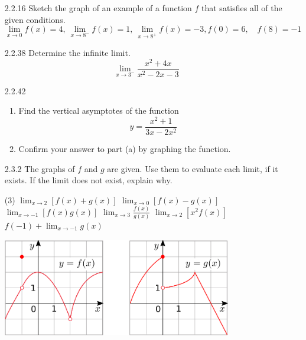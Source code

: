 \documentclass{article}
\begin{document}
\begin{enumerate}
    \newpage

    \item[2.2.16]
        Sketch the graph of an example of a function $f$ that satisfies all of the given conditions.
        \[
            \lim_{x \to 0} f(x) = 4,\
            \lim_{x \to 8^{-}} f(x) = 1,\
            \lim_{x \to 8^{+}} f(x) = -3,
            f(0)=6,\quad f(8)=-1
        \]

    \vspace{5.5cm}

    \item[2.2.38]
        Determine the infinite limit.
        \[
            \lim_{x \to 3^{-}} \frac{x^2 + 4x}{x^2 - 2x - 3}
        \]

    \vspace{4cm}

    \item[2.2.42]
        \begin{enumerate}
            \item Find the vertical asymptotes of the function
            \[
                y = \frac{x^2 + 1}{3x - 2x^2}
            \]
            \item Confirm your answer to part (a) by graphing the function.
        \end{enumerate}

    \newpage

    \item[2.3.2]
        The graphs of $f$ and $g$ are given. Use them to evaluate each limit, if it exists. If the limit does not exist, explain why.
        \begin{tasks}(3)
            \task
                $\displaystyle \lim_{x \to 2} \left[f(x) + g(x) \right]$
            \task
                $\displaystyle \lim_{x \to 0} \left[f(x) - g(x) \right]$
            \task
                $\displaystyle \lim_{x \to -1} \left[f(x)g(x) \right]$
            \task
                $\displaystyle \lim_{x \to 3} \frac{f(x)}{g(x)}$
            \task
                $\displaystyle \lim_{x \to 2} \left[x^2 f(x) \right]$
            \task
                $\displaystyle f(-1) + \lim_{x \to -1}g(x)$
        \end{tasks}

        \begin{center}
            \includegraphics[width=10cm]{./png/2.3.2.png}
        \end{center}


\end{enumerate}
\end{document}
